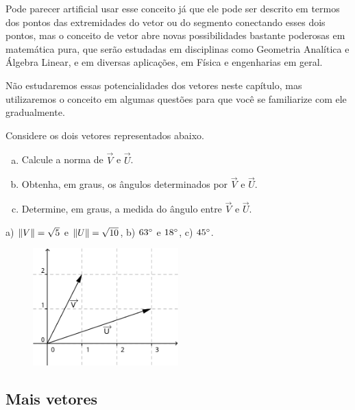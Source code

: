 \documentclass[main.tex]{subfiles}
\begin{document}
Pode parecer artificial usar esse conceito já que ele pode ser descrito em termos dos pontos das extremidades do vetor ou do segmento conectando esses dois pontos, mas o conceito de vetor abre novas possibilidades bastante poderosas em matemática pura, que serão estudadas em disciplinas como Geometria Analítica e Álgebra Linear, e em diversas aplicações, em Física e engenharias em geral.

Não estudaremos essas potencialidades dos vetores neste capítulo, mas utilizaremos o conceito em algumas questões para que você se familiarize com ele gradualmente.

\begin{questao}
Considere os dois vetores representados abaixo.
\begin{enumerate}[a)]
\item Calcule a norma de $\overrightarrow{V}$ e $\overrightarrow{U}$.
\item Obtenha, em graus, os ângulos determinados por $\overrightarrow{V}$ e $\overrightarrow{U}$.
\item Determine, em graus, a medida do ângulo entre $\overrightarrow{V}$ e $\overrightarrow{U}$.
\end{enumerate}
\end{questao}

\begin{gabarito}
	\begin{gabaritoQuestao}
		a) $\Arrowvert V \Arrowvert = \sqrt{5}$ e $\Arrowvert U \Arrowvert = \sqrt{10}$, b) $63\degree$ e $18\degree$, c) $45\degree$.
	\end{gabaritoQuestao}
\end{gabarito}


\begin{figure}[h]
\centering
\includegraphics[width=0.5\textwidth]{./img/c4q6.png}
\end{figure}

\subsection*{Mais vetores}
\end{document}
